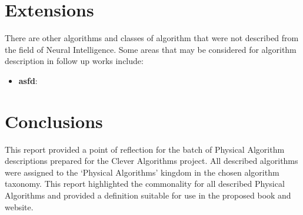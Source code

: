 \documentclass[a4paper, 11pt]{article}
\begin{document}
% 
% 
\section{Extensions}
\label{sec:extensions}
There are other algorithms and classes of algorithm that were not described from the field of Neural Intelligence. Some areas that may be considered for algorithm description in follow up works include:

\begin{itemize}
	\item \textbf{asfd}:
\end{itemize}

% 
% 
\section{Conclusions}
\label{sec:conclusions}
This report provided a point of reflection for the batch of Physical Algorithm descriptions prepared for the Clever Algorithms project. All described algorithms were assigned to the `Physical Algorithms' kingdom in the chosen algorithm taxonomy. This report highlighted the commonality for all described Physical Algorithms and provided a definition suitable for use in the proposed book and website.



\end{document}
